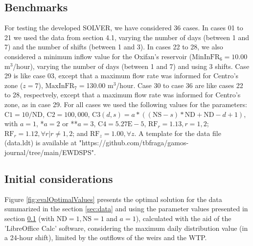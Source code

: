 \documentclass{singlecol}
\theoremstyle{TH}{
\newtheorem{lemma}{Lemma}
\newtheorem{theorem}[lemma]{Theorem}
\newtheorem{corrolary}[lemma]{Corrolary}
\newtheorem{conjecture}[lemma]{Conjecture}
\newtheorem{proposition}[lemma]{Proposition}
\newtheorem{claim}[lemma]{Claim}
\newtheorem{stheorem}[lemma]{Wrong Theorem}
\newtheorem{algorithm}{Algorithm}
}
\theoremstyle{THrm}{
\newtheorem{definition}{Definition}[section]
\newtheorem{question}{Question}[section]
\newtheorem{remark}{Remark}
\newtheorem{scheme}{Scheme}
}
\theoremstyle{THhit}{
\newtheorem{case}{Case}[section]
}
\begin{document}
\subsection{Benchmarks}
\label{sec:benchmarks}

For testing the developed SOLVER, we have considered 36 cases. In cases 01 to 21 we used the data from section 4.1, varying the number of days (between 1 and 7) and the number of shifts (between 1 and 3). In cases 22 to 28, we also considered a minimum inflow value for the Oxifan's reservoir ($\mathrm{MinInFR}_6 = 10.00$ m$^3$/hour), varying the number of days (between 1 and 7) and using 3 shifts. Case 29 is like case 03, except that a maximum flow rate was informed for Centro's zone ($z = 7$), $\mathrm{MaxInFR}_7 = $130.00 $\mathrm{m^3}$/hour. Case 30 to case 36 are like cases 22 to 28, respectvely, except that a maximum flow rate was informed for Centro's zone, as in case 29. For all cases we used the following values for the parameters: $\mathrm{C1}= 10/\mathrm{ND}$, $\mathrm{C2}= 100,000$, $\mathrm{C3}(d,s)=a*((\mathrm{NS}-s)*\mathrm{ND} + \mathrm{ND} - d + 1)$, with $a=1$, *$a=2$ or **$a=3$, $\mathrm{C4} = 5.27\mathrm{E-}5$, $\mathrm{RF}_r = 1.13, r=1,2$;  $\mathrm{RF}_r = 1.12,  \forall r | r \neq 1,2$; and $\mathrm{RF}_z =1.00, \forall z$. A template for the data file (data.ldt) is available at "https://github.com/tbfraga/gamos-journal/tree/main/EWDSPS".

\subsection{Initial considerations}
\label{sec:initialConsiderations}

Figure \ref{fig:evalOptimalValues} presents the optimal solution for the data summarized in the section \ref{sec:data} and using the parameter values presented in section \ref{sec:benchmarks} (with $\mathrm{ND}=1, \mathrm{NS}=1$ and $a=1$), calculated with the aid of the 'LibreOffice Calc' software, considering the maximum daily distribution value (in a 24-hour shift), limited by the outflows of the weirs and the WTP.
\end{document}
